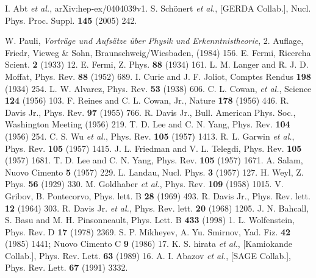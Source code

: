 \begin{thebibliography}{99}
I. Abt \textit{et al.}, arXiv:hep-ex/0404039v1.
S. Sch\"onert \textit{et al.}, [GERDA Collab.], Nucl. Phys. Proc. Suppl. \textbf{145} (2005) 242.

W. Pauli, \emph{Vortr\"age und Aufs\"atze \"uber Physik und Erkenntnistheorie}, 2. Auflage, Friedr, Vieweg \& Sohn, Braunschweig/Wiesbaden, (1984) 156.
E. Fermi, Ricercha Scient. \textbf{2} (1933) 12.
E. Fermi, Z. Phys. \textbf{88} (1934) 161.
L. M. Langer and R. J. D. Moffat, Phys. Rev. \textbf{88} (1952) 689.
I. Curie and J. F. Joliot, Comptes Rendus \textbf{198} (1934) 254.
L. W. Alvarez, Phys. Rev. \textbf{53} (1938) 606.
C. L. Cowan, \textit{et al.}, Science \textbf{124} (1956) 103.
F. Reines and C. L. Cowan, Jr., Nature \textbf{178} (1956) 446.
R. Davis Jr., Phys. Rev. \textbf{97} (1955) 766.
R. Davis Jr., Bull. American Phys. Soc., Washington Meeting (1956) 219.
T. D. Lee and C. N. Yang, Phys. Rev. \textbf{104} (1956) 254.
C. S. Wu \textit{et al.}, Phys. Rev. \textbf{105} (1957) 1413.
R. L. Garwin \textit{et al.}, Phys. Rev. \textbf{105} (1957) 1415.
J. L. Friedman and V. L. Telegdi, Phys. Rev. \textbf{105} (1957) 1681.
T. D. Lee and C. N. Yang, Phys. Rev. \textbf{105}  (1957) 1671.
A. Salam, Nuovo Cimento \textbf{5} (1957) 229.
L. Landau, Nucl. Phys. \textbf{3} (1957) 127.
H. Weyl, Z. Phys. \textbf{56} (1929) 330.
M. Goldhaber \textit{et al.}, Phys. Rev. \textbf{109}   (1958) 1015.
V. Gribov, B. Pontecorvo, Phys. lett. B \textbf{28}   (1969) 493.
R. Davis Jr., Phys. Rev. lett. \textbf{12} (1964) 303.
R. Davis Jr. \textit{et al.}, Phys. Rev. lett. \textbf{20} (1968) 1205.
J. N. Bahcall, S. Basu and M. H. Pinsonneault, Phys. Lett. B \textbf{433} (1998) 1.
L. Wolfenstein, Phys. Rev. D \textbf{17} (1978) 2369.
S. P. Mikheyev, A. Yu. Smirnov, Yad. Fiz. \textbf{42} (1985) 1441; Nuovo Cimento C \textbf{9} (1986) 17.
K. S. hirata \textit{et al.}, [Kamiokande Collab.], Phys. Rev. Lett. \textbf{63} (1989) 16.
A. I. Abazov \textit{et al.}, [SAGE Collab.], Phys. Rev. Lett. \textbf{67} (1991) 3332.

\end{thebibliography}
